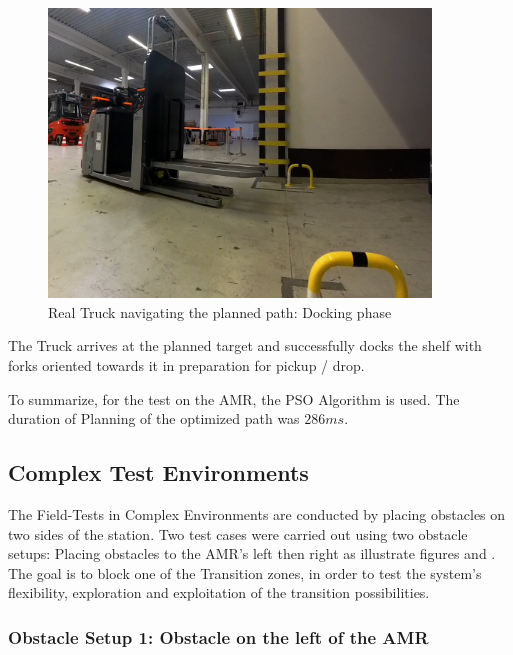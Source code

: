 \begin{figure}[H]
    \begin{center}
        \includegraphics[width=4in]{images/Chap3/Test1_real_dock.png} %
        \caption{Real Truck navigating the planned path: Docking phase}
        \label{OptResult61}
        \end{center}    
\end{figure}

The Truck arrives at the planned target and successfully 
docks the shelf with forks oriented towards it in preparation for
pickup / drop.

To summarize, for the test on the AMR, the PSO Algorithm is used. The duration of Planning of the optimized 
path was \(286ms\). 



\subsection{Complex Test Environments}
The Field-Tests in Complex Environments are conducted by placing obstacles on two sides of the 
station. 
Two test cases were carried out using two obstacle setups: Placing obstacles to the AMR's left then right
as illustrate figures  and . %
The goal is to block one of the Transition zones, in order to test the system's flexibility,
exploration and exploitation of the transition possibilities.



\subsubsection{Obstacle Setup 1: Obstacle on the left of the AMR}


